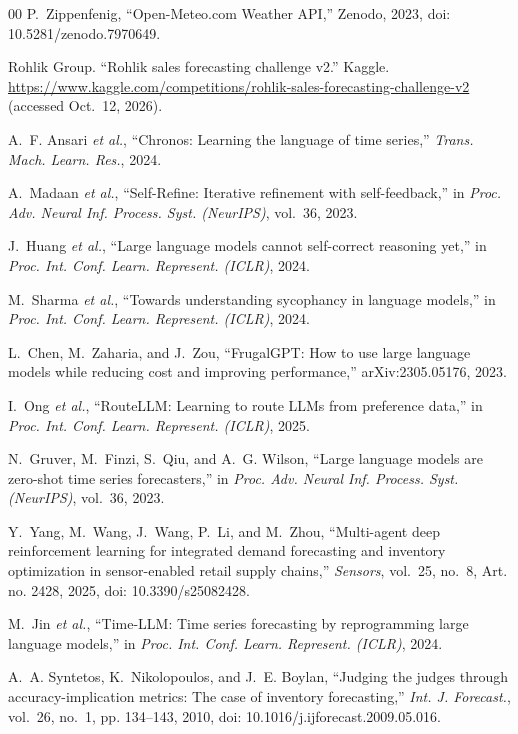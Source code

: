 \documentclass[conference]{IEEEtran}
\begin{document}
\begin{thebibliography}{00}
P.~Zippenfenig, ``Open-Meteo.com Weather API,'' Zenodo, 2023, doi: 10.5281/zenodo.7970649.

Rohlik Group. ``Rohlik sales forecasting challenge v2.'' Kaggle.
\url{https://www.kaggle.com/competitions/rohlik-sales-forecasting-challenge-v2} (accessed Oct.~12,
2026).

A.~F. Ansari \emph{et al.}, ``Chronos: Learning the language of time series,'' \emph{Trans. Mach.
Learn. Res.}, 2024.

A.~Madaan \emph{et al.}, ``Self-Refine: Iterative refinement with self-feedback,'' in \emph{Proc.
Adv. Neural Inf. Process. Syst. (NeurIPS)}, vol.~36, 2023.

J.~Huang \emph{et al.}, ``Large language models cannot self-correct reasoning yet,'' in
\emph{Proc. Int. Conf. Learn. Represent. (ICLR)}, 2024.

M.~Sharma \emph{et al.}, ``Towards understanding sycophancy in language models,'' in \emph{Proc.
Int. Conf. Learn. Represent. (ICLR)}, 2024.

L.~Chen, M.~Zaharia, and J.~Zou, ``FrugalGPT: How to use large language models while reducing cost
and improving performance,'' arXiv:2305.05176, 2023.

I.~Ong \emph{et al.}, ``RouteLLM: Learning to route LLMs from preference data,'' in \emph{Proc.
Int. Conf. Learn. Represent. (ICLR)}, 2025.

N.~Gruver, M.~Finzi, S.~Qiu, and A.~G. Wilson, ``Large language models are zero-shot time series
forecasters,'' in \emph{Proc. Adv. Neural Inf. Process. Syst. (NeurIPS)}, vol.~36, 2023.

Y.~Yang, M.~Wang, J.~Wang, P.~Li, and M.~Zhou, ``Multi-agent deep reinforcement learning for
integrated demand forecasting and inventory optimization in sensor-enabled retail supply chains,''
\emph{Sensors}, vol.~25, no.~8, Art. no. 2428, 2025, doi: 10.3390/s25082428.

M.~Jin \emph{et al.}, ``Time-LLM: Time series forecasting by reprogramming large language
models,'' in \emph{Proc. Int. Conf. Learn. Represent. (ICLR)}, 2024.

A.~A. Syntetos, K.~Nikolopoulos, and J.~E. Boylan, ``Judging the judges through
accuracy-implication metrics: The case of inventory forecasting,'' \emph{Int. J. Forecast.},
vol.~26, no.~1, pp. 134--143, 2010, doi: 10.1016/j.ijforecast.2009.05.016.


\end{thebibliography}
\end{document}

